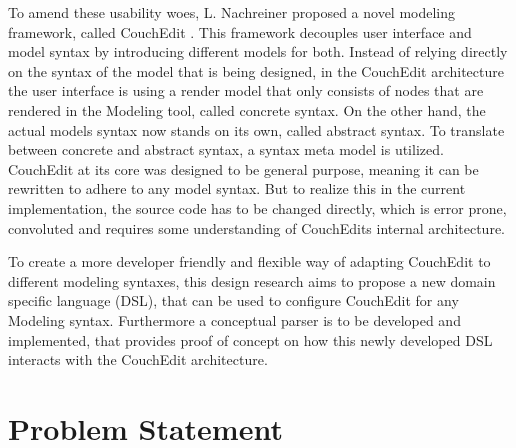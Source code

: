 \documentclass[10pt,a4paper,oneside]{scrartcl}
\newcommand\hint[2]{
\ifthenelse{\boolean{showhints}}{
\begin{center}
\colorbox{black!10}{
\begin{minipage}{.963\textwidth}
#2\hfill\textbf{#1}
\end{minipage}
}\end{center}}{}
}
\begin{document}
To amend these usability woes, L. Nachreiner proposed a novel modeling framework, called CouchEdit \cite{nachreiner_couchedit_2020}. This framework decouples user interface and model syntax by introducing different models for both. Instead of relying directly on the syntax of the model that is being designed, in the CouchEdit architecture the user interface is using a render model that only consists of nodes that are rendered in the Modeling tool, called concrete syntax. On the other hand, the actual models syntax now stands on its own, called abstract syntax. To translate between concrete and abstract syntax, a syntax meta model is utilized. CouchEdit at its core was designed to be general purpose, meaning it can be rewritten to adhere to any model syntax. But to realize this in the current implementation, the source code has to be changed directly, which is error prone, convoluted and requires some understanding of CouchEdits internal architecture.

To create a more developer friendly and flexible way of adapting CouchEdit to different modeling syntaxes, this design research aims to propose a new domain specific language (DSL), that can be used to configure CouchEdit for any Modeling syntax. Furthermore a conceptual parser is to be developed and implemented, that provides proof of concept on how this newly developed DSL interacts with the CouchEdit architecture.

\section{Problem Statement}
\label{sec:problem_statement}


\end{document}
